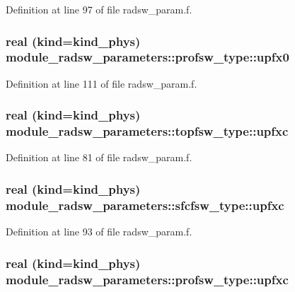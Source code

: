 Definition at line 97 of file radsw\+\_\+param.\+f.

\subsubsection[{\texorpdfstring{upfx0}{upfx0}}]{\setlength{\rightskip}{0pt plus 5cm}real (kind=kind\+\_\+phys) module\+\_\+radsw\+\_\+parameters\+::profsw\+\_\+type\+::upfx0}\hypertarget{group__module__radsw__main_gaa9205ed3a95d61dd8e4e7184fd6da43e}{}\label{group__module__radsw__main_gaa9205ed3a95d61dd8e4e7184fd6da43e}


Definition at line 111 of file radsw\+\_\+param.\+f.

\subsubsection[{\texorpdfstring{upfxc}{upfxc}}]{\setlength{\rightskip}{0pt plus 5cm}real (kind=kind\+\_\+phys) module\+\_\+radsw\+\_\+parameters\+::topfsw\+\_\+type\+::upfxc}\hypertarget{group__module__radsw__main_ga444a7fd67ff2c22403779a5e83eef09b}{}\label{group__module__radsw__main_ga444a7fd67ff2c22403779a5e83eef09b}


Definition at line 81 of file radsw\+\_\+param.\+f.

\subsubsection[{\texorpdfstring{upfxc}{upfxc}}]{\setlength{\rightskip}{0pt plus 5cm}real (kind=kind\+\_\+phys) module\+\_\+radsw\+\_\+parameters\+::sfcfsw\+\_\+type\+::upfxc}\hypertarget{group__module__radsw__main_ga89e2285e3148921e989cb27cda4294a1}{}\label{group__module__radsw__main_ga89e2285e3148921e989cb27cda4294a1}


Definition at line 93 of file radsw\+\_\+param.\+f.

\subsubsection[{\texorpdfstring{upfxc}{upfxc}}]{\setlength{\rightskip}{0pt plus 5cm}real (kind=kind\+\_\+phys) module\+\_\+radsw\+\_\+parameters\+::profsw\+\_\+type\+::upfxc}\hypertarget{group__module__radsw__main_ga5122ef2eef4e86a7aadf77114da4b3e2}{}\label{group__module__radsw__main_ga5122ef2eef4e86a7aadf77114da4b3e2}


